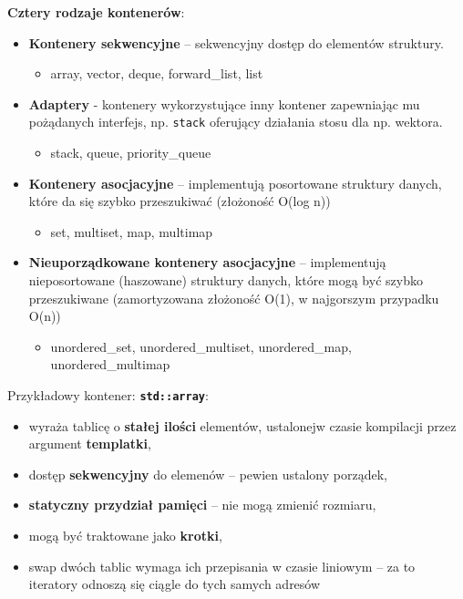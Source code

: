 \documentclass[main.tex]{subfiles}
\begin{document}
    \noindent \textbf{Cztery rodzaje kontenerów}:
    \begin{itemize}[noitemsep]
        \item \textbf{Kontenery sekwencyjne} -- sekwencyjny dostęp do elementów struktury.
        \begin{itemize}
            \item array, vector, deque, forward\_list, list
        \end{itemize}

        \item \textbf{Adaptery} - kontenery wykorzystujące inny kontener zapewniając mu pożądanych interfejs,
        np. \texttt{stack} oferujący działania stosu dla np. wektora.
        \begin{itemize}
            \item stack, queue, priority\_queue
        \end{itemize}

        \item \textbf{Kontenery asocjacyjne} -- implementują posortowane struktury danych, które da się szybko
        przeszukiwać (złożoność O(log n))
        \begin{itemize}
            \item set, multiset, map, multimap
        \end{itemize}

        \item \textbf{Nieuporządkowane kontenery asocjacyjne} -- implementują nieposortowane (haszowane)
        struktury danych, które mogą być szybko przeszukiwane (zamortyzowana złożoność O(1), w najgorszym przypadku O(n))
        \begin{itemize}
            \item unordered\_set, unordered\_multiset, unordered\_map, unordered\_multimap
        \end{itemize}
    \end{itemize}

    \noindent Przykładowy kontener: \textbf{\texttt{std::array}}:
    \begin{itemize}[noitemsep]
        \item wyraża tablicę o \textbf{stałej ilości} elementów, ustalonejw czasie kompilacji przez argument
        \textbf{templatki},
        \item dostęp \textbf{sekwencyjny} do elemenów -- pewien ustalony porządek,
        \item \textbf{statyczny przydział pamięci} -- nie mogą zmienić rozmiaru,
        \item mogą być traktowane jako \textbf{krotki},
        \item swap dwóch tablic wymaga ich przepisania w czasie liniowym -- za to iteratory odnoszą się ciągle
        do tych samych adresów
    \end{itemize}
\end{document}
